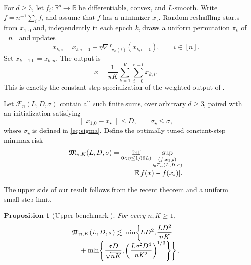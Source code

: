 \documentclass[twoside]{article}
\newtheorem{proposition}[theorem]{Proposition}
\newcommand{\E}{\mathbb E}
\newcommand{\R}{\mathbb R}
\newcommand{\cF}{\mathcal F}
\newcommand{\asympup}{\mathrel{\lesssim}}
\begin{document}
For $d\ge3$, let $f_i:\R^d\to\R$ be differentiable, convex, and
$L$-smooth. Write $f=n^{-1}\sum_i f_i$ and assume that $f$ has a minimizer
$x_\star$. Random reshuffling starts from $x_{1,0}$ and, independently in each
epoch $k$, draws a uniform permutation $\pi_k$ of $[n]$ and updates
\begin{equation}
 x_{k,i}=x_{k,i-1}-\eta\nabla f_{\pi_k(i)}(x_{k,i-1}),
 \qquad i\in[n].
 \label{eq:rr}
\end{equation}
Set $x_{k+1,0}=x_{k,n}$. The output is
\begin{equation}
 \bar x=\frac{1}{nK}\sum_{k=1}^K\sum_{i=0}^{n-1}x_{k,i}.
 \label{eq:output}
\end{equation}
This is exactly the constant-step specialization of the weighted output of
\citet{liu2026dominates}.

Let $\cF_n(L,D,\sigma)$ contain all such finite sums, over arbitrary
$d\ge3$, paired with an initialization satisfying
\begin{equation}
 \lVert x_{1,0}-x_\star\rVert\le D,
 \qquad \sigma_\star\le\sigma,
 \label{eq:class}
\end{equation}
where $\sigma_\star$ is defined in \eqref{eq:sigma}. Define the optimally
tuned constant-step minimax risk
\begin{equation}
\begin{aligned}
 \mathfrak M_{n,K}(L,D,\sigma)
 =\inf_{0<\eta\le1/(6L)}
 \sup_{\substack{(f,x_{1,0})\\
 \in\cF_n(L,D,\sigma)}}\\[-0.5ex]
 \hspace{2.8em}\E[f(\bar x)-f(x_\star)].
\end{aligned}
 \label{eq:minimax}
\end{equation}

The upper side of our result follows from the recent theorem and a uniform
small-step limit.

\begin{proposition}[Upper benchmark \citealp{liu2026dominates}]
\label{prop:upper}
For every $n,K\ge1$,
\begin{align}
 \mathfrak M_{n,K}(L,D,\sigma)
 \asympup
 \min\!\left\{LD^2,\frac{LD^2}{nK}\right.\quad\notag\\[-1ex]
 \left.{}+\min\!\left\{
 \frac{\sigma D}{\sqrt{nK}},
 \left(\frac{L\sigma^2D^4}{nK^2}\right)^{1/3}
 \right\}\right\}.
 \label{eq:upper}
\end{align}
\end{proposition}
\end{document}
